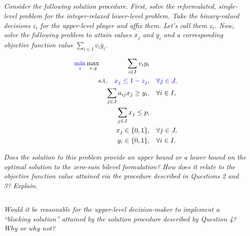 \documentclass[12pt]{amsart}
\begin{document}
\subsection{}
\textit{Consider the following solution procedure. First, solve the reformulated, single-level
	problem for the integer-relaxed lower-level problem. Take the binary-valued decisions $z_i$
	for the upper-level player and affix them. Let’s call them $z_i$. Now, solve the following
	problem to attain values $\bar x_j$ and $\bar y_i$ and a corresponding objective function 
	value $\sum_{i\in I}v_i\bar y_i$.}

	\begin{align*}
		{\color{blue}\min_z}\max_{x,y} \qquad\qquad \sum_{i\in I} v_iy_i& \\
		\text{s.t.}\quad
		{\color{blue} x_j \leq 1-z_j,}& \quad {\color{blue}\forall j\in J,}\\
		\sum_{j\in J} a_{ij}x_j \geq y_i,& \quad \forall i\in I, \\
		\sum_{j\in J} x_j \leq p,& \\
		x_j \in \{0,1\},& \quad \forall j\in J, \\
		y_i \in \{0,1\},& \quad \forall i\in I. \\
	\end{align*}

\textit{Does the solution to this problem provide an upper bound or a lower bound on the optimal
	solution to the zero-sum bilevel formulation? How does it relate to the objective function
	value attained via the procedure described in Questions 2 and 3? Explain.}
	

\subsection{}
\textit{Would it be reasonable for the upper-level decision-maker to implement a “blocking
	solution” attained by the solution procedure described by Question 4? Why or why not?}
\end{document}
